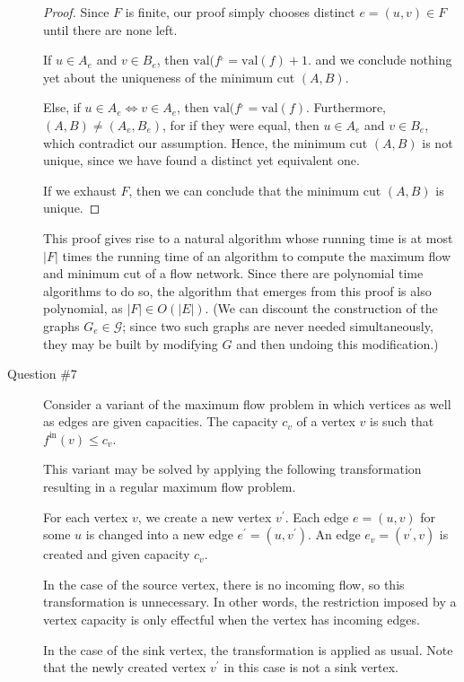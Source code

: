 \documentclass[letterpaper,11pt]{article}
\newcommand{\val}{\!\mathrm{val}}
\begin{document}
\begin{description}
        \begin{proof}
            Since $F$ is finite, our proof simply chooses distinct
            $e = (u, v) \in F$ until there are none left.

            If $u \in A_e$ and $v \in B_e$, then
            $\val{(f^_e} = \val{(f)} + 1$.
            and we conclude nothing yet about
            the uniqueness of the minimum cut $(A, B)$.

            Else, if $u \in A_e \iff v \in A_e$, then
            $\val{(f^_e} = \val{(f)}$. Furthermore, $(A, B) \neq (A_e, B_e)$,
            for if they were equal, then $u \in A_e$ and $v \in B_e$, which
            contradict our assumption. Hence, the minimum cut $(A, B)$ is not
            unique, since we have found a distinct yet equivalent one.

            If we exhaust $F$, then we can conclude that the minimum cut
            $(A, B)$ is unique.
        \end{proof}

        This proof gives rise to a natural algorithm whose running time is at
        most $|F|$ times the running time of an algorithm to compute the
        maximum flow and minimum cut of a flow network. Since there are
        polynomial time algorithms to do so, the algorithm that emerges from
        this proof is also polynomial, as $|F| \in O(|E|)$. (We can discount
        the construction of the graphs $G_e \in \mathcal{G}$; since two such
        graphs are never needed simultaneously, they may be built by modifying
        $G$ and then undoing this modification.)

    \item[Question \#7]

        Consider a variant of the maximum flow problem in which vertices as
        well as edges are given capacities. The capacity $c_v$ of a vertex $v$
        is such that $f^\mathrm{in}(v) \leq c_v$.

        This variant may be solved by applying the following transformation
        resulting in a regular maximum flow problem.

        For each vertex $v$, we create a new vertex $v^\prime$. Each edge
        $e = (u, v)$ for some $u$ is changed into a new edge
        $e^\prime = (u, v^\prime)$. An edge $e_v = (v^\prime, v)$ is created
        and given capacity $c_v$.

        In the case of the source vertex, there is no incoming flow, so this
        transformation is unnecessary. In other words, the restriction imposed
        by a vertex capacity is only effectful when the vertex has incoming
        edges.

        In the case of the sink vertex, the transformation is applied as usual.
        Note that the newly created vertex $v^\prime$ in this case is not a
        sink vertex.

\end{description}
\end{document}
